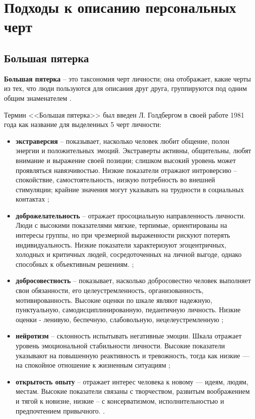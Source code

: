 \chapter{Подходы к описанию персональных черт}

\section{Большая пятерка}

\textbf{Большая пятерка} -- это таксономия черт личности; она отображает, какие черты из тех, что люди пользуются для описания друг друга, группируются под одним общим знаменателем \cite{big_five_traits}. 

Термин <<Большая пятерка>> был введен  Л. Голдбергом в своей работе 1981 года \cite{goldberg1981language} как название для выделенных 5 черт личности:

\begin{itemize}
	\item \textbf{экстраверсия} -- показывает, насколько человек любит общение, полон энергии и положительных эмоций. Экстраверты активны, общительны, любят внимание и выражение своей позиции; слишком высокий уровень может проявляться навязчивостью. Низкие показатели отражают интроверсию -- спокойствие, самостоятельность, низкую потребность во внешней стимуляции; крайние значения могут указывать на трудности в социальных контактах \cite{big_five_traits};
	
	\item \textbf{доброжелательность} -- отражает просоциальную направленность личности. Люди с высокими показателями мягкие, терпимые, ориентированы на интересы группы, но при чрезмерной выраженности рискуют потерять индивидуальность. Низкие показатели характеризуют эгоцентричных, холодных и критичных людей, сосредоточенных на личной выгоде, однако способных к объективным решениям. \cite{radyuk2016bigfive};
	
	\item \textbf{добросовестность} -- показывает, насколько добросовестно человек выполняет свои обязанности, его целеустремленность, организованность, мотивированность. Высокие оценки по шкале являют надежную, пунктуальную, самодисциплинированную, педантичную личность. Низкие оценки - ленивую, беспечную, слабовольную, нецелеустремленную \cite{big_five_traits};
	
	\item \textbf{нейротизм} -- склонность испытывать негативные эмоции. Шкала отражает уровень эмоциональной стабильности личности. Высокие показатели указывают на повышенную реактивность и тревожность, тогда как низкие — на спокойное отношение к жизненным ситуациям \cite{big_five_traits};
	
	\item \textbf{открытость опыту} -- отражает интерес человека к новому — идеям, людям, местам. Высокие показатели связаны с творчеством, развитым воображением и тягой к новизне, низкие -- с консерватизмом, исполнительностью и предпочтением привычного. \cite{big_five_traits}.
\end{itemize}

